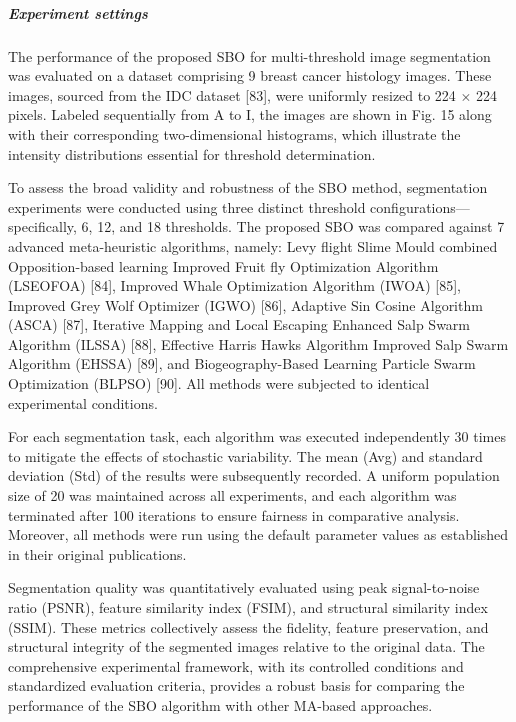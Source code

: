 \documentclass{article} %
\begin{document}
\subparagraph{ Experiment settings}

The performance of the proposed SBO for multi-threshold image segmentation was evaluated on a dataset comprising 9 breast cancer histology images. These images, sourced from the IDC dataset [83], were uniformly resized to 224 $\mathrm{\times}$ 224 pixels. Labeled sequentially from A to I, the images are shown in Fig. 15 along with their corresponding two-dimensional histograms, which illustrate the intensity distributions essential for threshold determination.

To assess the broad validity and robustness of the SBO method, segmentation experiments were conducted using three distinct threshold configurations---specifically, 6, 12, and 18 thresholds. The proposed SBO was compared against 7 advanced meta-heuristic algorithms, namely: Levy flight Slime Mould combined Opposition-based learning Improved Fruit fly Optimization Algorithm (LSEOFOA) [84], Improved Whale Optimization Algorithm (IWOA) [85], Improved Grey Wolf Optimizer (IGWO) [86], Adaptive Sin Cosine Algorithm (ASCA) [87], Iterative Mapping and Local Escaping Enhanced Salp Swarm Algorithm (ILSSA) [88], Effective Harris Hawks Algorithm Improved Salp Swarm Algorithm (EHSSA) [89], and Biogeography-Based Learning Particle Swarm Optimization (BLPSO) [90]. All methods were subjected to identical experimental conditions.

For each segmentation task, each algorithm was executed independently 30 times to mitigate the effects of stochastic variability. The mean (Avg) and standard deviation (Std) of the results were subsequently recorded. A uniform population size of 20 was maintained across all experiments, and each algorithm was terminated after 100 iterations to ensure fairness in comparative analysis. Moreover, all methods were run using the default parameter values as established in their original publications.

Segmentation quality was quantitatively evaluated using peak signal-to-noise ratio (PSNR), feature similarity index (FSIM), and structural similarity index (SSIM). These metrics collectively assess the fidelity, feature preservation, and structural integrity of the segmented images relative to the original data. The comprehensive experimental framework, with its controlled conditions and standardized evaluation criteria, provides a robust basis for comparing the performance of the SBO algorithm with other MA-based approaches.
\end{document}
